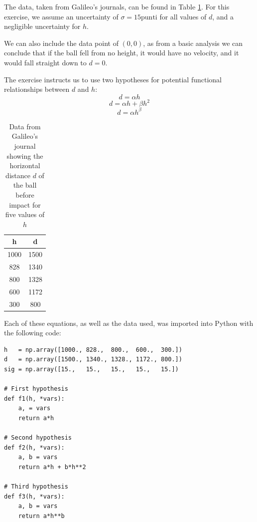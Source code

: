 \documentclass[a4paper]{article}
\begin{document}
The data, taken from Galileo's journals, can be found in Table \ref{tab:table}. For this exercise, we assume an uncertainty of $\sigma = 15\text{punti}$ for all values of $d$, and a negligible uncertainty for $h$.

We can also include the data point of $(0, 0)$, as from a basic analysis we can conclude that if the ball fell from no height, it would have no velocity, and it would fall straight down to $d=0$.

The exercise instructs us to use two hypotheses for potential functional relationships between $d$ and $h$:
\begin{equation}
d=\alpha h
\end{equation}
\begin{equation}
d=\alpha h+\beta h^2
\end{equation}
\begin{equation}
d=\alpha h^\beta
\end{equation}

\begin{table}[t!]
\centering
\begin{tabular}{cc}
h & d\\ \hline\hline
1000 & 1500 \\
828  & 1340 \\
800  & 1328 \\
600  & 1172 \\
300  & 800  \\\hline
\end{tabular}
\caption{\label{tab:table}Data from Galileo's journal showing the horizontal distance $d$ of the ball before impact for five values of $h$}
\end{table}

Each of these equations, as well as the data used, was imported into Python with the following code:
\begin{lstlisting}
h   = np.array([1000., 828.,  800.,  600.,  300.])
d   = np.array([1500., 1340., 1328., 1172., 800.])
sig = np.array([15.,   15.,   15.,   15.,   15.])

# First hypothesis
def f1(h, *vars):
    a, = vars
    return a*h

# Second hypothesis
def f2(h, *vars):
    a, b = vars
    return a*h + b*h**2

# Third hypothesis
def f3(h, *vars):
    a, b = vars
    return a*h**b
\end{lstlisting}
\end{document}
